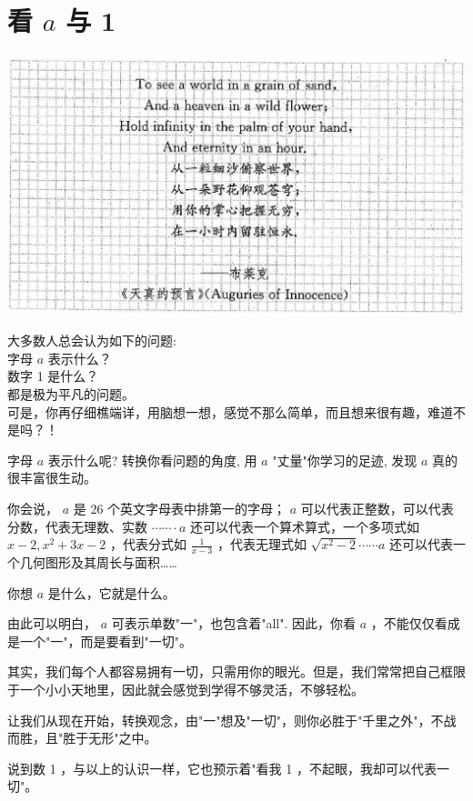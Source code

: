 \documentclass[10pt]{article}
\begin{document}
\section*{看 $a$ 与 1}
\begin{center}
\includegraphics[max width=\textwidth]{2024_10_30_26b590fd1106d28139f0g-007}
\end{center}

大多数人总会认为如下的问题:\\
字母 $a$ 表示什么？\\
数字 1 是什么？\\
都是极为平凡的问题。\\
可是，你再仔细樵端详，用脑想一想，感觉不那么简单，而且想来很有趣，难道不是吗？！

字母 $a$ 表示什么呢? 转换你看问题的角度, 用 $a$ "丈量"你学习的足迹, 发现 $a$ 真的很丰富很生动。

你会说， $a$ 是 26 个英文字母表中排第一的字母； $a$ 可以代表正整数，可以代表分数，代表无理数、实数 $\cdots \cdots \cdot a$ 还可以代表一个算术算式，一个多项式如 $x-2, x^{2}+3 x-2$ ，代表分式如 $\frac{1}{x-3}$ ，代表无理式如 $\sqrt{x^{2}-2} \cdots \cdots a$ 还可以代表一个几何图形及其周长与面积……

你想 $a$ 是什么，它就是什么。

由此可以明白， $a$ 可表示单数"一"，也包含着"all". 因此，你看 $a$ ，不能仅仅看成是一个"一"，而是要看到"一切"。

其实，我们每个人都容易拥有一切，只需用你的眼光。但是，我们常常把自己框限于一个小小天地里，因此就会感觉到学得不够灵活，不够轻松。

让我们从现在开始，转换观念，由"一"想及"一切"，则你必胜于"千里之外"，不战而胜，且"胜于无形"之中。

说到数 1 ，与以上的认识一样，它也预示着"看我 1 ，不起眼，我却可以代表一切"。
\end{document}
